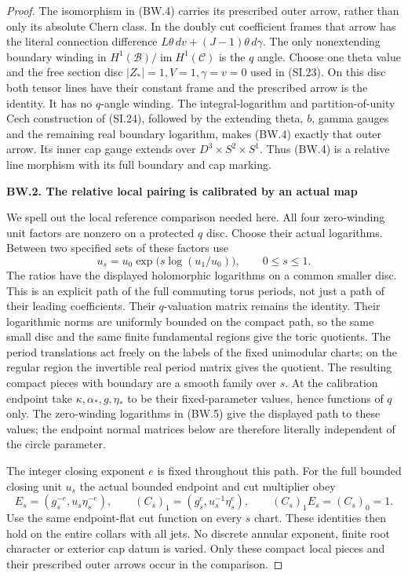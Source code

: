 \begin{proof}
The isomorphism in (BW.4) carries its prescribed outer arrow, rather
than only its absolute Chern class. In the doubly cut coefficient
frames that arrow has the literal connection difference
\(L\theta\,dv+(J-1)\theta\,d\gamma\). The only nonextending boundary
winding in \(H^1(\mathcal B)/\operatorname{im}H^1(\mathcal C)\) is the
\(q\) angle. Choose one theta value and the free section disc
\(|Z_*|=1,V=1,\gamma=v=0\) used in (SI.23). On this disc both tensor
lines have their constant frame and the prescribed arrow is the
identity. It has no \(q\)-angle winding. The integral-logarithm and
partition-of-unity Cech construction of (SI.24), followed by the
extending theta, \(b\), gamma gauges and the remaining real boundary
logarithm, makes (BW.4) exactly that outer arrow. Its inner cap gauge
extends over \(D^3\times S^2\times S^1\). Thus (BW.4) is a relative
line morphism with its full boundary and cap marking.

\par

\medskip\noindent\textbf{BW.2. The relative local pairing is calibrated by an actual map}

\par\nobreak

We spell out the local reference comparison needed here. All four
zero-winding unit factors are nonzero on a protected \(q\) disc. Choose
their actual logarithms. Between two specified sets of these factors
use
\[
 u_s=u_0\exp\bigl(s\log(u_1/u_0)\bigr),\qquad0\le s\le1.
                                                        \tag{BW.5}
\]
The ratios have the displayed holomorphic logarithms on a common
smaller disc. This is an explicit path of the full commuting torus
periods, not just a path of their leading coefficients. Their
\(q\)-valuation matrix remains the identity. Their logarithmic norms
are uniformly bounded on the compact path, so the same small disc
and the same finite fundamental regions give the toric quotients.
The period translations act freely on the labels of the fixed
unimodular charts; on the regular region the invertible real period
matrix gives the quotient. The resulting compact pieces with
boundary are a smooth family over \(s\).
At the calibration endpoint take \(\kappa,\alpha_*,g,\eta_*\)
to be their fixed-parameter values, hence functions of \(q\) only.
The zero-winding logarithms in (BW.5) give the displayed path to
these values; the endpoint normal matrices below are therefore
literally independent of the circle parameter.

The integer closing exponent \(e\) is fixed throughout this path.
For the full bounded closing unit \(u_s\) the actual bounded endpoint
and cut multiplier obey
\[
 E_s=(g_s^{-e},u_s\eta_s^{-e}),\qquad
 (C_s)_1=(g_s^e,u_s^{-1}\eta_s^e),\qquad
 (C_s)_1E_s=(C_s)_0=1.
                                                        \tag{BW.5a}
\]
Use the same endpoint-flat cut function on every \(s\) chart. These
identities then hold on the entire collars with all jets. No
discrete annular exponent, finite root character or exterior cap
datum is varied. Only these compact local pieces and their
prescribed outer arrows occur in the comparison.


\end{proof}

